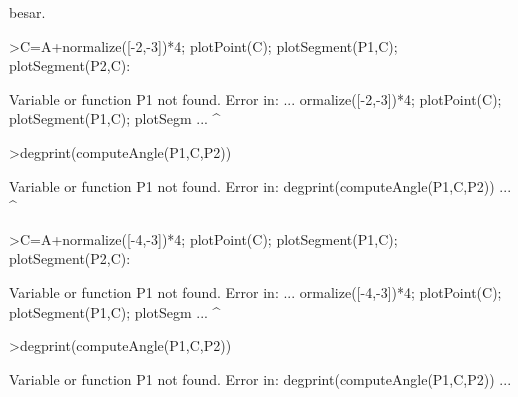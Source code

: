 \documentclass[a4paper,10pt]{article}
\begin{document}
\begin{eulernotebook}
\begin{eulercomment}
\begin{eulercomment}
\begin{eulercomment}
\begin{eulercomment}
\begin{eulercomment}
\begin{eulercomment}
\begin{eulercomment}
\begin{eulercomment}
\begin{eulercomment}
\begin{eulercomment}
\begin{eulercomment}
\begin{eulercomment}
\begin{eulercomment}
\begin{eulercomment}
\begin{eulercomment}
\begin{eulercomment}
\begin{eulercomment}
\begin{eulercomment}
\begin{eulercomment}
\begin{eulercomment}
\begin{eulercomment}
\begin{eulercomment}
\begin{eulercomment}
\begin{eulercomment}
\begin{eulercomment}
\begin{eulercomment}
\begin{eulercomment}
\begin{eulercomment}
\begin{eulercomment}
\begin{eulercomment}
\begin{eulercomment}
\begin{eulercomment}
\begin{eulercomment}
\begin{eulercomment}
\begin{eulercomment}
\begin{eulercomment}
\begin{eulercomment}
\begin{eulercomment}
\begin{eulercomment}
\begin{eulercomment}
\begin{eulercomment}
\begin{eulercomment}
\begin{eulercomment}
\begin{eulercomment}
\begin{eulercomment}
\begin{eulercomment}
\begin{eulercomment}
\begin{eulercomment}
\begin{eulercomment}
\begin{eulercomment}
\begin{eulercomment}
\begin{eulercomment}
\begin{eulercomment}
\begin{eulercomment}
\begin{eulercomment}
\begin{eulercomment}
\begin{eulercomment}
\begin{eulercomment}
\begin{eulercomment}
\begin{eulercomment}
\begin{eulercomment}
\begin{eulercomment}
\begin{eulercomment}
besar.
\end{eulercomment}
\begin{eulerprompt}
>C=A+normalize([-2,-3])*4; plotPoint(C); plotSegment(P1,C); plotSegment(P2,C):
\end{eulerprompt}
\begin{euleroutput}
  Variable or function P1 not found.
  Error in:
  ... ormalize([-2,-3])*4; plotPoint(C); plotSegment(P1,C); plotSegm ...
                                                       ^
\end{euleroutput}
\begin{eulerprompt}
>degprint(computeAngle(P1,C,P2))
\end{eulerprompt}
\begin{euleroutput}
  Variable or function P1 not found.
  Error in:
  degprint(computeAngle(P1,C,P2)) ...
                          ^
\end{euleroutput}
\begin{eulerprompt}
>C=A+normalize([-4,-3])*4; plotPoint(C); plotSegment(P1,C); plotSegment(P2,C):
\end{eulerprompt}
\begin{euleroutput}
  Variable or function P1 not found.
  Error in:
  ... ormalize([-4,-3])*4; plotPoint(C); plotSegment(P1,C); plotSegm ...
                                                       ^
\end{euleroutput}
\begin{eulerprompt}
>degprint(computeAngle(P1,C,P2))
\end{eulerprompt}
\begin{euleroutput}
  Variable or function P1 not found.
  Error in:
  degprint(computeAngle(P1,C,P2)) ...
                          
\end{euleroutput}
\end{eulercomment}
\end{eulercomment}
\end{eulercomment}
\end{eulercomment}
\end{eulercomment}
\end{eulercomment}
\end{eulercomment}
\end{eulercomment}
\end{eulercomment}
\end{eulercomment}
\end{eulercomment}
\end{eulercomment}
\end{eulercomment}
\end{eulercomment}
\end{eulercomment}
\end{eulercomment}
\end{eulercomment}
\end{eulercomment}
\end{eulercomment}
\end{eulercomment}
\end{eulercomment}
\end{eulercomment}
\end{eulercomment}
\end{eulercomment}
\end{eulercomment}
\end{eulercomment}
\end{eulercomment}
\end{eulercomment}
\end{eulercomment}
\end{eulercomment}
\end{eulercomment}
\end{eulercomment}
\end{eulercomment}
\end{eulercomment}
\end{eulercomment}
\end{eulercomment}
\end{eulercomment}
\end{eulercomment}
\end{eulercomment}
\end{eulercomment}
\end{eulercomment}
\end{eulercomment}
\end{eulercomment}
\end{eulercomment}
\end{eulercomment}
\end{eulercomment}
\end{eulercomment}
\end{eulercomment}
\end{eulercomment}
\end{eulercomment}
\end{eulercomment}
\end{eulercomment}
\end{eulercomment}
\end{eulercomment}
\end{eulercomment}
\end{eulercomment}
\end{eulercomment}
\end{eulercomment}
\end{eulercomment}
\end{eulercomment}
\end{eulercomment}
\end{eulercomment}
\end{eulernotebook}
\end{document}
